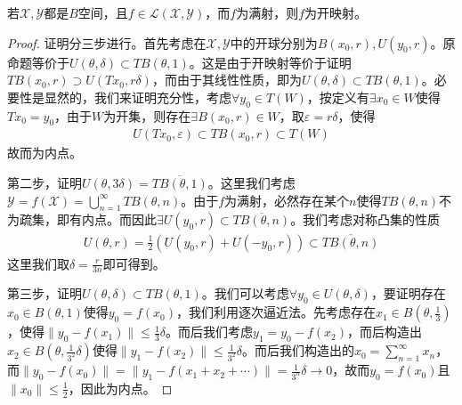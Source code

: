 \begin{theorem}[开映射定理]
    若$\mathscr{X},\mathscr{Y}$都是$B$空间，且$f\in\mathscr{L}(\mathscr{X},\mathscr{Y})$，而$f$为满射，则$f$为开映射。
\end{theorem}
\begin{proof}
    证明分三步进行。首先考虑在$\mathscr{X},\mathscr{Y}$中的开球分别为$B(x_0,r),U(y_0,r)$。原命题等价于$U(\theta,\delta)\subset TB(\theta,1)$。这是由于开映射等价于证明$TB(x_0,r)\supset U(Tx_0,r\delta)$，而由于其线性性质，即为$U(\theta,\delta)\subset TB(\theta,1)$。必要性是显然的，我们来证明充分性，考虑$\forall y_0\in T(W)$，按定义有$\exists x_0\in W$使得$Tx_0 = y_0$，由于$W$为开集，则存在$\exists B(x_0,r)\in W$，取$\varepsilon = r\delta$，使得
    \begin{align*}
        U(Tx_0, \varepsilon) \subset TB(x_0, r) \subset T(W)
    \end{align*}
    故而为内点。

    第二步，证明$U(\theta,3\delta) = \overline{TB(\theta,1)}$。这里我们考虑$\mathscr{Y} = f(\mathscr{X}) = \bigcup\limits_{n=1}^{\infty} TB(\theta, n)$。由于$f$为满射，必然存在某个$n$使得$TB(\theta, n)$不为疏集，即有内点。而因此$\exists U(y_0,r)\subset \overline{TB(\theta, n)}$。我们考虑对称凸集的性质
    \begin{align*}
        U(\theta,r) = \frac{1}{2}(U(y_0, r) + U(-y_0,r)) \subset \overline{TB(\theta, n)}
    \end{align*}
    这里我们取$\delta = \frac{r}{3n}$即可得到。

    第三步，证明$U(\theta,\delta)\subset TB(\theta,1)$。我们可以考虑$\forall y_0\in U(\theta,\delta)$，要证明存在$x_0\in B(\theta,1)$使得$y_0 = f(x_0)$，我们利用逐次逼近法。先考虑存在$x_1\in B(\theta, \frac{1}{3})$，使得$\| y_0 - f(x_1)\| \leqslant \frac{1}{3}\delta$。而后我们考虑$y_1 = y_0 - f(x_2)$，而后构造出$x_2\in B(\theta,\frac{1}{3^2}\delta)$使得$\| y_1 - f(x_2)\| \leqslant \frac{1}{3^2}\delta$。而后我们构造出的$x_0 = \sum\limits_{n=1}^{\infty} x_n$，而$\|y_0 - f(x_0)\| = \|y_1 - f(x_1+x_2+\cdots)\| = \frac{1}{3^n}\delta\to 0$，故而$y_0 = f(x_0)$且$\|x_0\| \leqslant \frac{1}{2}$，因此为内点。
\end{proof}

